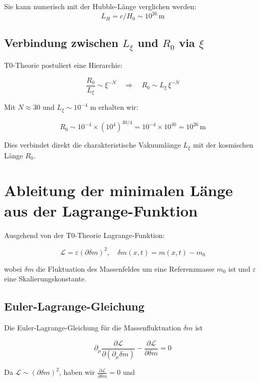 \documentclass[12pt,a4paper]{article}
\numberwithin{equation}{section}
\begin{document}
	Sie kann numerisch mit der Hubble-Länge verglichen werden:
	\[
	L_H = c / H_0 \sim 10^{26}\,\text{m}
	\]
	
	\subsection{Verbindung zwischen $L_\xi$ und $R_0$ via $\xi$}
	
	T0-Theorie postuliert eine Hierarchie:
	
	\[
	\frac{R_0}{L_\xi} \sim \xi^{-N} \quad \Rightarrow \quad R_0 \sim L_\xi \, \xi^{-N}
	\]
	
	Mit $N \approx 30$ und $L_\xi \sim 10^{-4}$ m erhalten wir:
	
	\[
	R_0 \sim 10^{-4} \times (10^4)^{30/4} = 10^{-4} \times 10^{30} = 10^{26}\,\text{m}
	\]
	
	Dies verbindet direkt die charakteristische Vakuumlänge $L_\xi$ mit der kosmischen Länge $R_0$.
	
	
	
	
	\section{Ableitung der minimalen Länge aus der Lagrange-Funktion}
	
	Ausgehend von der T0-Theorie Lagrange-Funktion:
	
	\begin{equation}
		\mathcal{L} = \varepsilon (\partial \delta m)^2, \quad \delta m(x,t) = m(x,t) - m_0
	\end{equation}
	
	wobei $\delta m$ die Fluktuation des Massenfeldes um eine Referenzmasse $m_0$ ist und $\varepsilon$ eine Skalierungskonstante.
	
	\subsection{Euler-Lagrange-Gleichung}
	
	Die Euler-Lagrange-Gleichung für die Massenfluktuation $\delta m$ ist
	
	\begin{equation}
		\partial_\mu \frac{\partial \mathcal{L}}{\partial (\partial_\mu \delta m)} - \frac{\partial \mathcal{L}}{\partial \delta m} = 0
	\end{equation}
	
	Da $\mathcal{L} \sim (\partial \delta m)^2$, haben wir $\frac{\partial \mathcal{L}}{\partial \delta m} = 0$ und
	
\end{document}
